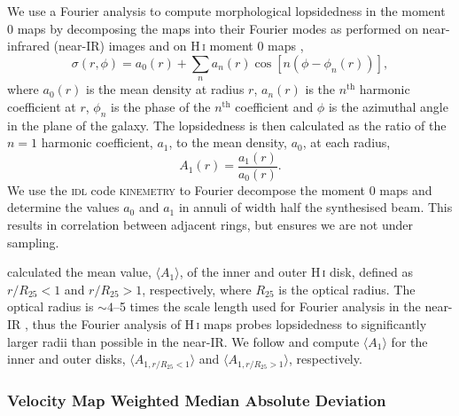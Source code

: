 \documentclass[fleqn,usenatbib]{mnras}
\begin{document}
We use a Fourier analysis to compute morphological lopsidedness in the moment 0 maps by decomposing the maps into their Fourier modes as performed on near-infrared (near-IR) images \citep[e.g.][]{Zaritsky1997,Bournaud2005b} and on H\,\textsc{i} moment 0 maps \citep{Angiras2006,Angiras2007,vanEymeren2011b},
\begin{equation}
	\displaystyle \sigma(r,\phi)=a_0(r)+\sum_n a_n(r)\cos[n(\phi-\phi_n(r))],
	\label{equ:mom0_fd}
\end{equation}
where $a_0(r)$ is the mean density at radius $r$, $a_n(r)$ is the $n^{\mathrm{th}}$ harmonic coefficient at $r$, $\phi_n$ is the phase of the $n^{\mathrm{th}}$ coefficient and $\phi$ is the azimuthal angle in the plane of the galaxy. The lopsidedness is then calculated as the ratio of the $n=1$ harmonic coefficient, $a_1$, to the mean density, $a_0$, at each radius,
\begin{equation}
	\displaystyle A_1(r)=\frac{a_1(r)}{a_0(r)}.
	\label{equ:fd_asym}
\end{equation}
We use the \textsc{idl} code \textsc{kinemetry} \citep{Krajnovic2006} to Fourier decompose the moment 0 maps and determine the values $a_0$ and $a_1$ in annuli of width half the synthesised beam. This results in correlation between adjacent rings, but ensures we are not under sampling.

\cite{vanEymeren2011b} calculated the mean value, $\langle A_1\rangle$, of the inner and outer H\,\textsc{i} disk, defined as $r/R_{25}<1$ and $r/R_{25}>1$, respectively, where $R_{25}$ is the optical radius. The optical radius is $\sim4$--5 times the scale length used for Fourier analysis in the near-IR \citep{vanderKruit1982,Zaritsky1997,Bournaud2005b}, thus the Fourier analysis of H\,\textsc{i} maps probes lopsidedness to significantly larger radii than possible in the near-IR. We follow \cite{vanEymeren2011b} and compute $\langle A_1\rangle$ for the inner and outer disks, $\langle A_{1,r/R_{25}<1}\rangle$ and $\langle A_{1,r/R_{25}>1}\rangle$, respectively.


\subsubsection{Velocity Map Weighted Median Absolute Deviation}
\label{ss-sec:vel_mad}
\end{document}
